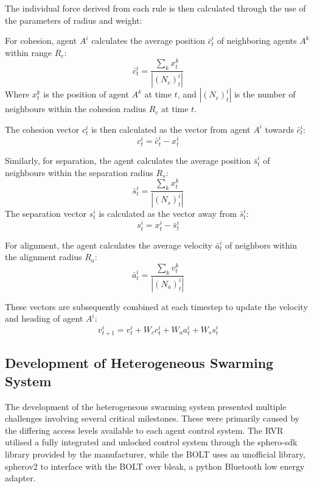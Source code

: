 \documentclass[conference]{IEEEtran}
\begin{document}
The individual force derived from each rule is then calculated through the use of the parameters of radius and weight:

For cohesion, agent $A^i$ calculates the average position $\bar{c}_t^i$ of neighboring agents $A^k$ within range $R_c$:
\begin{equation}
\bar{c}_t^i = \frac{\sum_k x_t^k}{\left| (N_{c})_t^i \right|}
\label{eq2}
\end{equation}
Where $x_t^k$ is the position of agent $A^k$ at time $t$, and $\left| (N_{c})_t^i \right|$ is the number of neighbours within the cohesion radius $R_c$ at time $t$.

The cohesion vector $c_t^i$ is then calculated as the vector from agent $A^i$ towards $\bar{c}_t^i$:
\begin{equation}
c_t^i = \bar{c}_t^i - x_t^i
\label{eq3}
\end{equation}

Similarly, for separation, the agent calculates the average position $\bar{s}_t^i$ of neighbours within the separation radius $R_s$:
\begin{equation}
\bar{s}_t^i = \frac{\sum_k x_t^k}{\left| (N_{s})_t^i \right|}
\label{eq4}
\end{equation}
The separation vector $s_t^i$ is calculated as the vector away from $\bar{s}_t^i$:
\begin{equation}
s_t^i = x_t^i - \bar{s}_t^i
\label{eq5}
\end{equation}

For alignment, the agent calculates the average velocity $\bar{a}_t^i$ of neighbors within the alignment radius $R_a$:
\begin{equation}
\bar{a}_t^i = \frac{\sum_k v_t^k}{\left| (N_{a})_t^i \right|}
\label{eq6}
\end{equation}

These vectors are subsequently combined at each timestep to update the velocity and heading of agent $A^i$:
\begin{equation}
v_{t+1}^i = v_t^i + W_c c_t^i + W_a a_t^i + W_s s_t^i
\label{eq7}
\end{equation}

\subsection{Development of Heterogeneous Swarming System}

The development of the heterogeneous swarming system presented multiple challenges involving several critical milestones. These were primarily caused by the differing access levels available to each agent control system. The RVR utilised a fully integrated and unlocked control system through the sphero-sdk library provided by the manufacturer, while the BOLT uses an unofficial library, spherov2 to interface with the BOLT over bleak, a python Bluetooth low energy adapter.
\end{document}
